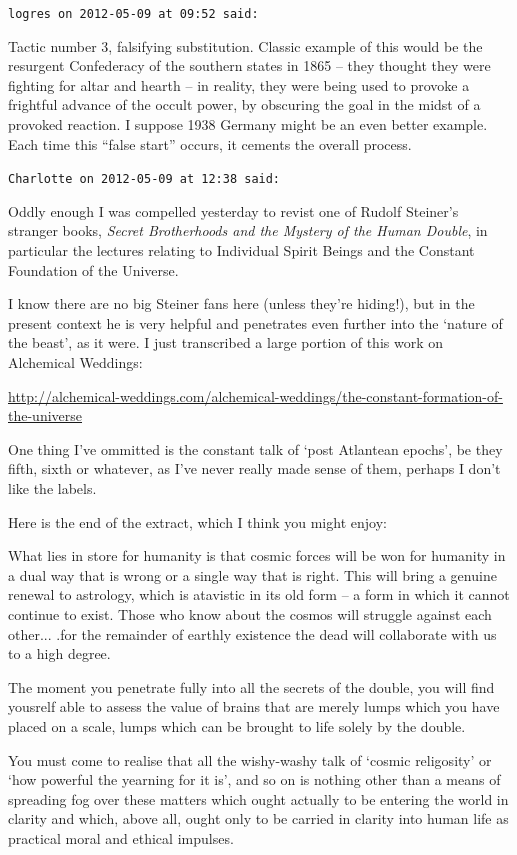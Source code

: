 \begin{footnotesize}
\begin{sffamily}
\hfill

\texttt{logres on 2012-05-09 at 09:52 said:}

Tactic number 3, falsifying substitution. Classic example of this would be the resurgent Confederacy of the southern states in 1865 -- they thought they were fighting for altar and hearth -- in reality, they were being used to provoke a frightful advance of the occult power, by obscuring the goal in the midst of a provoked reaction. I suppose 1938 Germany might be an even better example. Each time this ``false start'' occurs, it cements the overall process.

\hfill

\texttt{Charlotte on 2012-05-09 at 12:38 said:}

Oddly enough I was compelled yesterday to revist one of Rudolf Steiner's stranger books, \textit{Secret Brotherhoods and the Mystery of the Human Double}, in particular the lectures relating to Individual Spirit Beings and the Constant Foundation of the Universe.

I know there are no big Steiner fans here (unless they're hiding!), but in the present context he is very helpful and penetrates even further into the `nature of the beast', as it were. I just transcribed a large portion of this work on Alchemical Weddings:

\url{http://alchemical-weddings.com/alchemical-weddings/the-constant-formation-of-the-universe}


One thing I've ommitted is the constant talk of `post Atlantean epochs', be they fifth, sixth or whatever, as I've never really made sense of them, perhaps I don't like the labels.

Here is the end of the extract, which I think you might enjoy:

What lies in store for humanity is that cosmic forces will be won for humanity in a dual way that is wrong or a single way that is right. This will bring a genuine renewal to astrology, which is atavistic in its old form -- a form in which it cannot continue to exist. Those who know about the cosmos will struggle against each other... .for the remainder of earthly existence the dead will collaborate with us to a high degree.

The moment you penetrate fully into all the secrets of the double, you will find yousrelf able to assess the value of brains that are merely lumps which you have placed on a scale, lumps which can be brought to life solely by the double.

You must come to realise that all the wishy-washy talk of `cosmic religosity' or `how powerful the yearning for it is', and so on is nothing other than a means of spreading fog over these matters which ought actually to be entering the world in clarity and which, above all, ought only to be carried in clarity into human life as practical moral and ethical impulses.


\end{sffamily}
\end{footnotesize}
